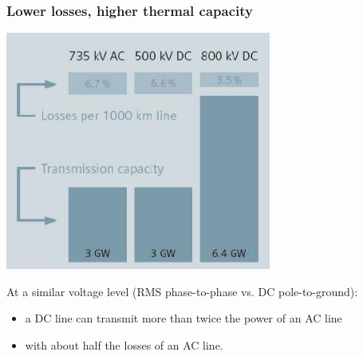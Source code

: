 \begin{frame}
\frametitle{Lower losses, higher thermal capacity}
\begin{center}
    \includegraphics[width=0.3\linewidth]{images/losses.png}
\end{center}
At a similar voltage level (RMS phase-to-phase vs. DC pole-to-ground):
\begin{itemize}
    \item a DC line can transmit more than twice the power of an AC line
    \item with about half the losses of an AC line.
\end{itemize}
\end{frame}



